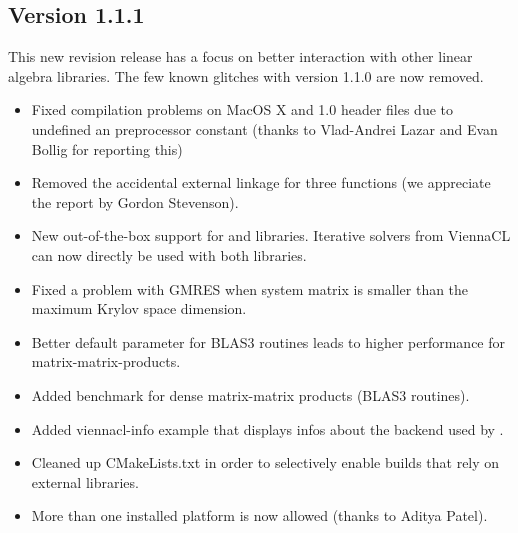 \subsection*{Version 1.1.1}
This new revision release has a focus on better interaction with other linear algebra libraries. The few known glitches with version 1.1.0 are now removed.
\begin{itemize}
 \item Fixed compilation problems on MacOS X and {\OpenCL} 1.0 header files due to undefined an preprocessor constant (thanks to Vlad-Andrei Lazar and Evan Bollig for reporting this)
 \item Removed the accidental external linkage for three functions (we appreciate the report by Gordon Stevenson).
 \item New out-of-the-box support for {\Eigen} \cite{eigen} and {\MTL} \cite{mtl4} libraries. Iterative solvers from ViennaCL can now directly be used with both libraries.
 \item Fixed a problem with GMRES when system matrix is smaller than the maximum Krylov space dimension.
 \item Better default parameter for BLAS3 routines leads to higher performance for matrix-matrix-products.
 \item Added benchmark for dense matrix-matrix products (BLAS3 routines).
 \item Added viennacl-info example that displays infos about the {\OpenCL} backend used by {\ViennaCL}.
 \item Cleaned up CMakeLists.txt in order to selectively enable builds that rely on external libraries.
 \item More than one installed {\OpenCL} platform is now allowed (thanks to Aditya Patel).
\end{itemize}


